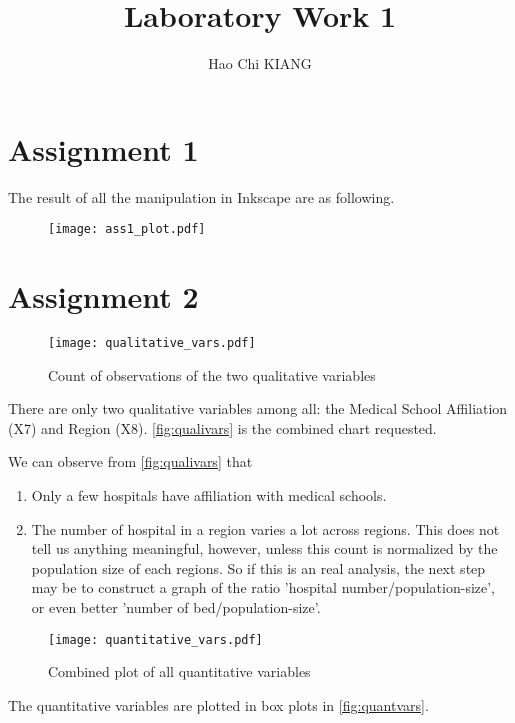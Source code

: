 \documentclass[11pt]{article}
\begin{document}
\author{Hao Chi KIANG}
\title{Laboratory Work 1}
\maketitle

\section{Assignment 1}
The result of all the manipulation in Inkscape are as following.

\begin{figure}[ht]
  \centering
  \texttt{[image: ass1\_plot.pdf]}
\end{figure}



\section{Assignment 2}

\begin{figure}[ht]
  \centering
  \texttt{[image: qualitative\_vars.pdf]}
  \caption{Count of observations of the two
    qualitative variables}\label{fig:qualivars}
\end{figure}

There are only two qualitative variables among all: the Medical School
Affiliation (X7) and Region (X8). \autoref{fig:qualivars} is the combined
chart requested.

We can observe from \autoref{fig:qualivars} that
\begin{enumerate}
\item
  Only a few hospitals have affiliation with medical schools.
\item
  The number of hospital in a region varies a lot across regions. This
  does not tell us anything meaningful, however, unless this count is
  normalized by the population size of each regions. So if this is an
  real analysis, the next step may be to construct a graph of the ratio
  'hospital number/population-size', or even better
  'number of bed/population-size'.
\end{enumerate}


\begin{figure}[ht]
  \centering
  \texttt{[image: quantitative\_vars.pdf]}
  \caption{Combined plot of all quantitative variables}\label{fig:quantvars}
\end{figure}

The quantitative variables are plotted in box plots in \autoref{fig:quantvars}.
\end{document}

